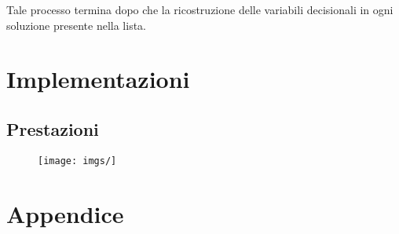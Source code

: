 \documentclass{llncs}
\newcommand{\labelsec}[1]{\label{sec:#1}}
\newcommand{\labelssec}[1]{\label{ssec:#1}}
\begin{document}
Tale processo termina dopo che la ricostruzione delle variabili decisionali in ogni soluzione presente nella lista. 

\section{Implementazioni}
\labelsec{implementazioni}


\subsection{Prestazioni}
\labelssec{presntazioni}


\begin{figure}[!h]
  \centering
  \texttt{[image: imgs/]}
  \caption{}
  \label{fig:__}
\end{figure}

\appendix

\section{Appendice}
\end{document}
